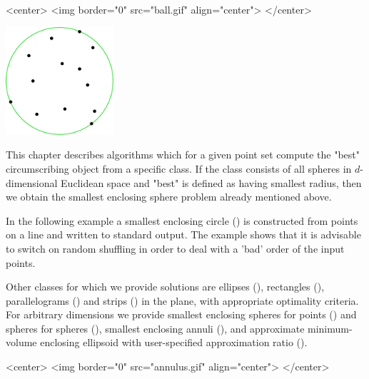 
\begin{ccHtmlOnly}
<center>
<img border="0" src="ball.gif" align="center">
</center>
\end{ccHtmlOnly} 

\begin{ccTexOnly}
\begin{center}
\includegraphics[width=4cm]{Bounding_volumes/ball}
\end{center}
\end{ccTexOnly}


This chapter describes algorithms which for a given point set compute
the "best" circumscribing  object from a specific
class. If the class consists of all spheres in $d$-dimensional
Euclidean space and "best" is defined as having smallest radius,
then we obtain the smallest enclosing sphere problem already mentioned
above.

In the following example a smallest enclosing circle
() is constructed from points 
on a line and written to standard output. The example
shows that it is advisable to switch on random shuffling 
in order to deal with a 'bad' order of the input points. 


Other classes for which we provide solutions are ellipses
(), rectangles
(), parallelograms
() and strips ()
in the plane, with appropriate optimality criteria. For arbitrary
dimensions we provide smallest enclosing spheres for points
() and spheres for spheres
(), smallest enclosing
annuli (), and approximate
minimum-volume enclosing ellipsoid with user-specified
approximation ratio ().

\begin{ccHtmlOnly}
<center>
<img border="0" src="annulus.gif" align="center">
</center>
\end{ccHtmlOnly} 

